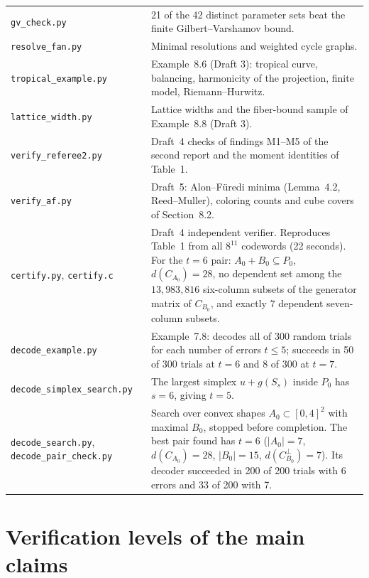 \documentclass[12pt,letterpaper]{article}
\begin{document}
\begin{longtable}{@{}L{0.34\textwidth}L{0.58\textwidth}@{}}
\texttt{gv\_check.py} & 21 of the 42 distinct parameter sets beat the finite
Gilbert--Varshamov bound.\\
\texttt{resolve\_fan.py} & Minimal resolutions and weighted cycle graphs.\\
\texttt{tropical\_example.py} & Example~8.6 (Draft 3): tropical curve,
balancing, harmonicity of the projection, finite model, Riemann--Hurwitz.\\
\texttt{lattice\_width.py} & Lattice widths and the fiber-bound sample of
Example~8.8 (Draft 3).\\
\texttt{verify\_referee2.py} & Draft~4 checks of findings M1--M5 of the
second report and the moment identities of Table~1.\\
\texttt{verify\_af.py} & Draft~5: Alon--F\"uredi minima (Lemma~4.2,
Reed--Muller), coloring counts and cube covers of Section~8.2.\\
\texttt{certify.py}, \texttt{certify.c} & Draft~4 independent verifier.
Reproduces Table~1 from all $8^{11}$ codewords (22 seconds). For the $t=6$
pair: $A_0+B_0\subseteq P_0$, $d(C_{A_0})=28$, no dependent set among the
$13{,}983{,}816$ six-column subsets of the generator matrix of $C_{B_0}$, and
exactly $7$ dependent seven-column subsets.\\
\texttt{decode\_example.py} & Example~7.8: decodes all of 300 random trials
for each number of errors $t\le5$; succeeds in 50 of 300 trials at $t=6$ and
8 of 300 at $t=7$.\\
\texttt{decode\_simplex\_\allowbreak search.py} & The largest simplex $u+g(S_s)$ inside
$P_0$ has $s=6$, giving $t=5$.\\
\texttt{decode\_search.py}, \texttt{decode\_pair\_check.py} & Search over
convex shapes $A_0\subset[0,4]^2$ with maximal $B_0$, stopped before
completion. The best pair found has
$t=6$ ($|A_0|=7$, $d(C_{A_0})=28$, $|B_0|=15$, $d(C_{B_0}^\perp)=7$). Its
decoder succeeded in 200 of 200 trials with 6 errors and 33 of 200 with 7.\\
\bottomrule
\end{longtable}

\section{Verification levels of the main claims}\label{sec:levels}
\end{document}
